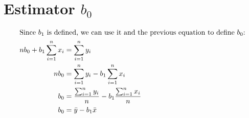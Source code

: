 \documentclass{article}
\begin{document}
\pagebreak

\section*{Estimator $b_0$}
\begin{align*}
    \intertext{Since $b_1$ is defined, we can use it and the previous equation to define $b_0$:}
    n b_0 + b_1 \sum_{i=1}^n x_i & = \sum_{i=1}^n y_i                                            \\
    n b_0                        & = \sum_{i=1}^n y_i - b_1 \sum_{i=1}^n x_i                     \\
    b_0                          & = \frac{\sum_{i=1}^n y_i}{n} - b_1 \frac{\sum_{i=1}^n x_i}{n} \\
    b_0                          & = \bar{y} - b_1 \bar{x}
\end{align*}
\end{document}
